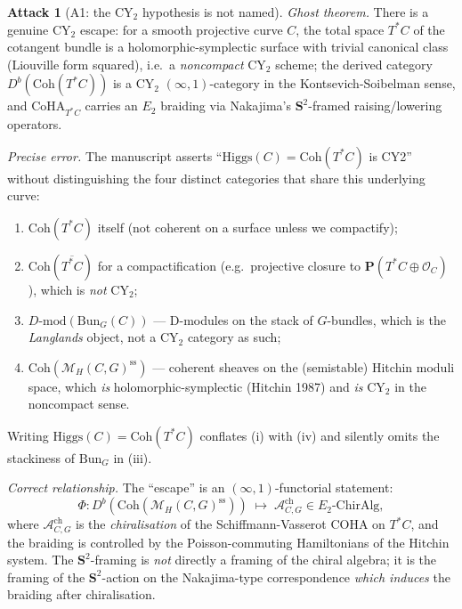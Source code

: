 \documentclass[11pt]{amsart}
\theoremstyle{definition}
\newtheorem{attack}{Attack}
\providecommand{\CY}{\mathrm{CY}}
\providecommand{\Coh}{\mathrm{Coh}}
\providecommand{\DMod}{D\text{-}\mathrm{mod}}
\providecommand{\Etwo}{E_2}
\providecommand{\cM}{\mathcal{M}}
\providecommand{\cO}{\mathcal{O}}
\providecommand{\bS}{\mathbf{S}}
\providecommand{\Bun}{\mathrm{Bun}}
\providecommand{\CoHA}{\mathrm{CoHA}}
\begin{document}
\begin{attack}[A1: the CY$_2$ hypothesis is not named]\leavevmode

\noindent\emph{Ghost theorem.} There is a genuine $\CY_2$ escape:
for a smooth projective curve $C$, the total space $T^*C$ of the
cotangent bundle is a holomorphic-symplectic surface with trivial
canonical class (Liouville form squared), i.e.\ a {\em noncompact}
$\CY_2$ scheme; the derived category $D^b(\Coh(T^*C))$ is a $\CY_2$
$(\infty,1)$-category in the Kontsevich-Soibelman sense, and
$\CoHA_{T^*C}$ carries an $\Etwo$ braiding via Nakajima's
$\bS^2$-framed raising/lowering operators.

\noindent\emph{Precise error.} The manuscript asserts
``$\mathrm{Higgs}(C) = \Coh(T^*C)$ is CY2'' without distinguishing the
four distinct categories that share this underlying curve:

\begin{enumerate}[label=(\roman*)]
 \item $\Coh(T^*C)$ itself (not coherent on a surface unless we
   compactify);
 \item $\Coh(\overline{T^*C})$ for a compactification (e.g.\ projective
   closure to $\mathbf{P}(T^*C \oplus \cO_C)$), which is {\em not}
   $\CY_2$;
 \item $\DMod(\Bun_G(C))$ --- D-modules on the stack of $G$-bundles,
   which is the {\em Langlands} object, not a $\CY_2$ category as
   such;
 \item $\Coh(\cM_H(C,G)^{\mathrm{ss}})$ --- coherent sheaves on the
   (semistable) Hitchin moduli space, which {\em is} holomorphic-symplectic
   (Hitchin 1987) and {\em is} $\CY_2$ in the noncompact sense.
\end{enumerate}

Writing $\mathrm{Higgs}(C) = \Coh(T^*C)$ conflates (i) with (iv) and
silently omits the stackiness of $\Bun_G$ in (iii).

\noindent\emph{Correct relationship.} The ``escape'' is an
$(\infty,1)$-functorial statement:
\[
 \Phi \colon D^b(\Coh(\cM_H(C,G)^{\mathrm{ss}}))
 \;\longmapsto\; \mathcal{A}_{C,G}^{\mathrm{ch}} \in \Etwo\text{-}\mathrm{ChirAlg},
\]
where $\mathcal{A}_{C,G}^{\mathrm{ch}}$ is the {\em chiralisation} of
the Schiffmann-Vasserot COHA on $T^*C$, and the braiding is controlled
by the Poisson-commuting Hamiltonians of the Hitchin system. The
$\bS^2$-framing is {\em not} directly a framing of the chiral algebra;
it is the framing of the $\bS^2$-action on the Nakajima-type
correspondence \emph{which induces} the braiding after chiralisation.
\end{attack}
\end{document}
